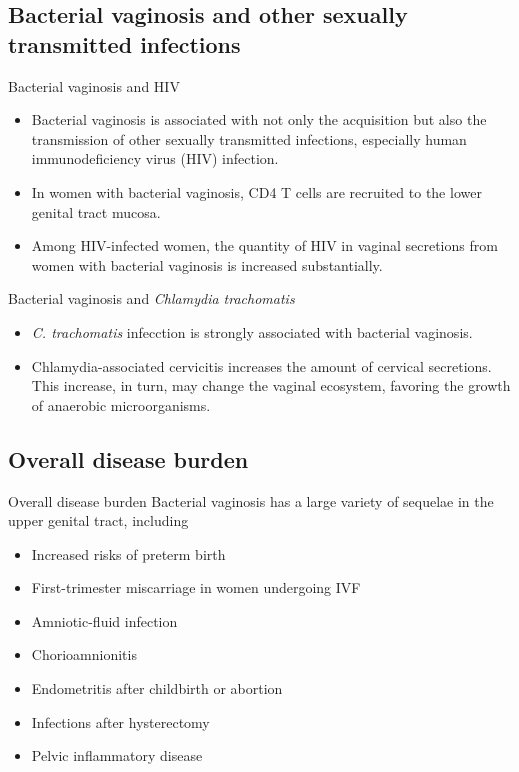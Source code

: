 \documentclass{beamer}
\begin{document}
\subsection{Bacterial vaginosis and other sexually transmitted infections}
\begin{frame}{Bacterial vaginosis and HIV}
    \begin{itemize}
        \item Bacterial vaginosis is associated with not only the acquisition
              but also the transmission of other sexually transmitted
              infections, especially human immunodeficiency virus (HIV)
              infection.
        \item In women with bacterial vaginosis, CD4 T cells are recruited to
              the lower genital tract mucosa.
        \item Among HIV-infected women, the quantity of HIV in vaginal
              secretions from women with bacterial vaginosis is increased
              substantially.
    \end{itemize}
\end{frame}

\begin{frame}{Bacterial vaginosis and \textit{Chlamydia trachomatis}}
    \begin{itemize}
        \item \textit{C. trachomatis} infecction is strongly associated with
              bacterial vaginosis.
        \item Chlamydia-associated cervicitis increases the amount of cervical
              secretions. This increase, in turn, may change the vaginal
              ecosystem, favoring the growth of anaerobic microorganisms.
    \end{itemize}
\end{frame}

\subsection{Overall disease burden}
\begin{frame}{Overall disease burden}
    Bacterial vaginosis has a large variety of sequelae in the upper genital
    tract, including
    \begin{itemize}
        \item Increased risks of preterm birth
        \item First-trimester miscarriage in women undergoing IVF
        \item Amniotic-fluid infection
        \item Chorioamnionitis
        \item Endometritis after childbirth or abortion
        \item Infections after hysterectomy
        \item Pelvic inflammatory disease
    \end{itemize}
\end{frame}
\end{document}
